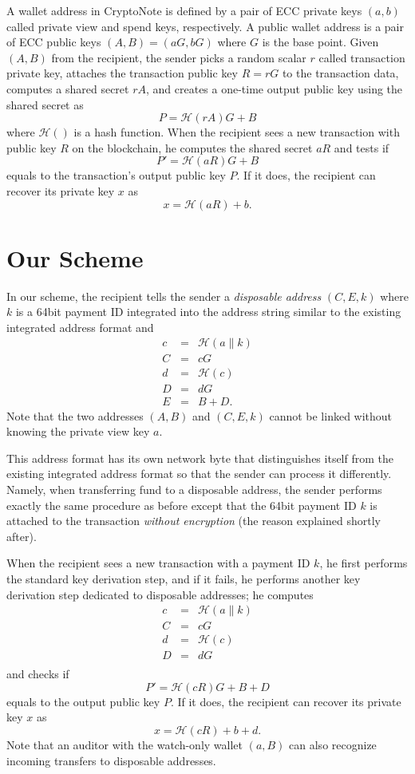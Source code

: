 \documentclass[12pt,english]{mrl}
\theoremstyle{definition}
\numberwithin{equation}{section}
\numberwithin{figure}{section}
\numberwithin{equation}{section}
\numberwithin{equation}{section}
\numberwithin{figure}{section}
\begin{document}
A wallet address in CryptoNote is defined by a pair of ECC private keys $(a,b)$ called private view and spend keys, respectively. A public wallet address is a pair of ECC public keys $(A,B)=(aG,bG)$ where $G$ is the base point. Given $(A,B)$ from the recipient, the sender picks a random scalar $r$ called transaction private key, attaches the transaction public key $R=rG$ to the transaction data, computes a shared secret $rA$, and creates a one-time output public key using the shared secret as
\[
P=\mathcal{H}(rA)G+B
\]
where $\mathcal{H}()$ is a hash function. When the recipient sees a new transaction with public key $R$ on the blockchain, he computes the shared secret $aR$ and tests if
\[
P'=\mathcal{H}(aR)G+B
\]
equals to the transaction's output public key $P$. If it does, the recipient can recover its private key $x$ as
\[
x = \mathcal{H}(aR)+b.
\]


\section{Our Scheme}\label{ourScheme}

In our scheme, the recipient tells the sender a \emph{disposable address} $(C,E,k)$ where $k$ is a 64bit payment ID integrated into the address string similar to the existing integrated address format and
\begin{eqnarray*}
c &=& \mathcal{H}(a \| k) \\
C &=& cG \\
d &=& \mathcal{H}(c) \\
D &=& dG \\
E &=& B + D.
\end{eqnarray*}
Note that the two addresses $(A,B)$ and $(C,E,k)$ cannot be linked without knowing the private view key $a$.

This address format has its own network byte that distinguishes itself from the existing integrated address format so that the sender can process it differently.
Namely, when transferring fund to a disposable address, the sender performs exactly the same procedure as before except that the 64bit payment ID $k$ is attached to the transaction \emph{without encryption} (the reason explained shortly after).

When the recipient sees a new transaction with a payment ID $k$, he first performs the standard key derivation step, and if it fails, he performs another key derivation step dedicated to disposable addresses; he computes
\begin{eqnarray*}
c &=& \mathcal{H}(a \| k) \\
C &=& cG \\
d &=& \mathcal{H}(c) \\
D &=& dG \\
\end{eqnarray*}
and checks if
\[
P' = \mathcal{H}(cR)G + B + D
\]
equals to the output public key $P$. If it does, the recipient can recover its private key $x$ as
\[
x = \mathcal{H}(cR)+b+d.
\]
Note that an auditor with the watch-only wallet $(a,B)$ can also recognize incoming transfers to disposable addresses.
\end{document}
